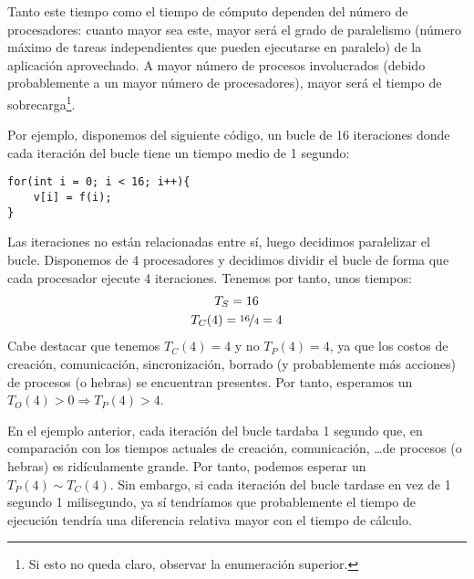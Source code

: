 Tanto este tiempo como el tiempo de cómputo dependen del número de procesadores: cuanto mayor sea este, mayor será el grado de paralelismo (número máximo de tareas independientes que pueden ejecutarse en paralelo) de la aplicación aprovechado. A mayor número de procesos involucrados (debido probablemente a un mayor número de procesadores), mayor será el tiempo de sobrecarga\footnote{Si esto no queda claro, observar la enumeración superior.}.

\begin{ejemplo}
    Por ejemplo, disponemos del siguiente código, un bucle de 16 iteraciones donde cada iteración del bucle tiene un tiempo medio de 1 segundo:
    \begin{verbatim}
for(int i = 0; i < 16; i++){
    v[i] = f(i);
}
    \end{verbatim}
    Las iteraciones no están relacionadas entre sí, luego decidimos paralelizar el bucle. Disponemos de 4 procesadores y decidimos dividir el bucle de forma que cada procesador ejecute 4 iteraciones. Tenemos por tanto, unos tiempos:
    \begin{gather*}
        T_S = 16 \\
        T_C(4) = \nicefrac{16}{4} = 4
    \end{gather*}
    Cabe destacar que tenemos $T_C(4)=4$ y no $T_P(4)=4$, ya que los costos de creación, comunicación, sincronización, borrado (y probablemente más acciones) de procesos (o hebras) se encuentran presentes. Por tanto, esperamos un $T_O(4) > 0\Longrightarrow T_P(4) > 4$.
\end{ejemplo}

En el ejemplo anterior, cada iteración del bucle tardaba 1 segundo que, en comparación con los tiempos actuales de creación, comunicación, \ldots de procesos (o hebras) es ridículamente grande. Por tanto, podemos esperar un $T_P(4) \sim T_C(4)$. Sin embargo, si cada iteración del bucle tardase en vez de 1 segundo 1 milisegundo, ya sí tendríamos que probablemente el tiempo de ejecución tendría una diferencia relativa mayor con el tiempo de cálculo.

